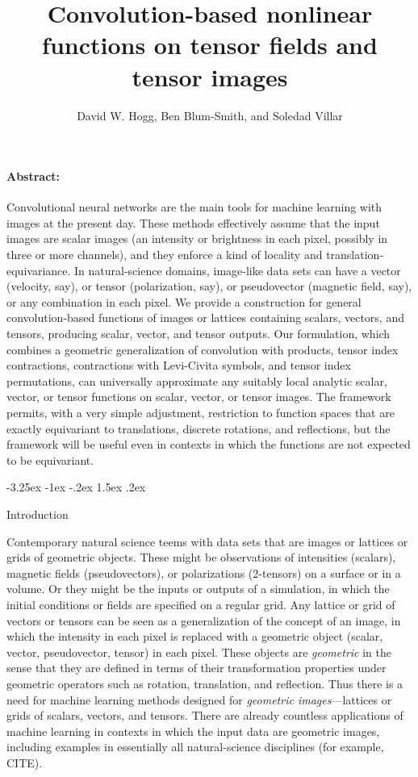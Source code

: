 \documentclass{article}
\title{\bfseries%
Convolution-based nonlinear functions on tensor fields and tensor images}
\author{David W. Hogg, Ben Blum-Smith, and Soledad Villar}
\date{}
\makeatletter
\theoremstyle{plain}
\renewcommand\section{\@startsection {section}{1}{\z@}%
  {-3.25ex \@plus -1ex \@minus -.2ex}%
  {1.5ex \@plus .2ex}%
  {\raggedright\normalfont\large\bfseries}}%
\makeatother
\begin{document}
\maketitle\thispagestyle{empty}

\paragraph{Abstract:}
Convolutional neural networks are the main tools for machine learning with images at the present day.
These methods effectively assume that the input images are scalar images (an intensity or brightness in each pixel, possibly in three or more channels), and they enforce a kind of locality and translation-equivariance.
In natural-science domains, image-like data sets can have a vector (velocity, say), or tensor (polarization, say), or pseudovector (magnetic field, say), or any combination in each pixel.
We provide a construction for general convolution-based functions of images or lattices
containing scalars, vectors, and tensors, producing scalar, vector, and tensor outputs.
Our formulation, which combines a geometric generalization of convolution with products, tensor index contractions, contractions with Levi-Civita symbols, and tensor index permutations, can universally approximate any suitably local analytic scalar, vector, or tensor functions on scalar, vector, or tensor images.
The framework permits, with a very simple adjustment, restriction to function spaces that are exactly equivariant to translations, discrete rotations, and reflections, but the framework will be useful even in contexts in which the functions are not expected to be equivariant.

\section{Introduction}

Contemporary natural science teems with data sets that are images or lattices or grids of geometric objects.
These might be observations of intensities (scalars), magnetic fields (pseudovectors), or polarizations (2-tensors) on a surface or in a volume.
Or they might be the inputs or outputs of a simulation, in which the initial conditions or fields are specified on a regular grid.
Any lattice or grid of vectors or tensors can be seen as a generalization of the concept of an image, in which the intensity in each pixel is replaced with a geometric object (scalar, vector, pseudovector, tensor) in each pixel.
These objects are \emph{geometric} in the sense that they are defined in terms of their transformation properties under geometric operators such as rotation, translation, and reflection.
Thus there is a need for machine learning methods designed for \emph{geometric images}---lattices or grids of scalars, vectors, and tensors.
There are already countless applications of machine learning in contexts in which the input data are geometric images, including examples in essentially all natural-science disciplines (for example, CITE).
\end{document}
